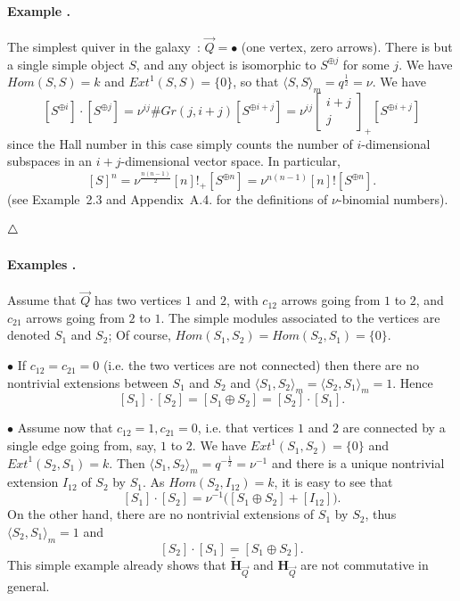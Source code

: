 \documentclass[a4paper,10pt]{amsart}
\def\H{\mathbf{H}}
\def\endexample{$\hfill \triangle$}
\def\v{\nu}
\numberwithin{equation}{section}
\begin{document}
\paragraph{\textbf{Example \thetheo.}} The simplest quiver in the galaxy~: $\vec{Q}=\bullet$ (one vertex, zero arrows). There is but a single simple object $S$, and any object is isomorphic to $S^{\oplus j}$ for some $j$. We have ${Hom}(S,S)=k$ and ${Ext}^1(S,S)=\{0\}$, so that $\langle S,S \rangle_m=q^{\frac{1}{2}}=\v$. We have
$$[S^{\oplus i}] \cdot [S^{\oplus j}]=\v^{ij} \# Gr(j,i+j) [S^{\oplus i+j}]=\v^{ij} \begin{bmatrix} i+j \\ j \end{bmatrix}_+ [S^{\oplus i+j}]$$
since the Hall number in this case simply counts the number of $i$-dimensional subspaces in an $i+j$-dimensional vector space.  In particular,
\begin{equation}\label{E:powerE}
[S]^n=\v^{\frac{n(n-1)}{2}} [n]!_+ [S^{\oplus n}]=\v^{n(n-1)}[n]! [S^{\oplus n}].
\end{equation}
(see Example~2.3 and Appendix~A.4. for the definitions of $\v$-binomial numbers).

\endexample

\vspace{.15in}

\addtocounter{theo}{1}
\paragraph{\textbf{Examples \thetheo.}} Assume that $\vec{Q}$ has two vertices $1$ and $2$, with $c_{12}$ arrows going from $1$ to $2$, and $c_{21}$ arrows going from $2$ to $1$. The simple modules associated to the vertices are denoted $S_1$ and $S_2$; Of course, ${Hom}(S_1,S_2)={Hom}(S_2,S_1)=\{0\}$.

\vspace{.05in}

\noindent
$\bullet$ If $c_{12}=c_{21}=0$ (i.e. the two vertices are not connected) then
there are no nontrivial extensions between $S_1$ and $S_2$ and $\langle S_1,S_2 \rangle_m=\langle S_2,S_1 \rangle_m=1$. Hence
$$[S_1] \cdot [S_2]=[S_1 \oplus S_2]=[S_2] \cdot [S_1].$$

\vspace{.05in}

\noindent
$\bullet$ Assume now that $c_{12}=1, c_{21}=0$, i.e. that vertices $1$ and $2$ are connected by a single edge going from, say, $1$ to $2$. We have ${Ext}^1(S_1,S_2)=\{0\}$ and ${Ext}^1(S_2,S_1)=k$. Then
$\langle S_1,S_2 \rangle_m=q^{-\frac{1}{2}}=\v^{-1}$ and there is a unique nontrivial extension $I_{12}$ of $S_2$ by $S_1$. As ${Hom}(S_2,I_{12})=k$, it is easy to see that
$$[S_1] \cdot [S_2]=\v^{-1} \big( [S_1 \oplus S_2] + [I_{12}]\big).$$
On the other hand, there are no nontrivial extensions of $S_1$ by $S_2$, thus $\langle S_2,S_1\rangle_m=1$ and
$$[S_2] \cdot [S_1] = [S_1 \oplus S_2].$$
This simple example already shows that $\widetilde{\mathbf{H}}_{\vec{Q}}$ and $\H_{\vec{Q}}$ are not commutative in general.
\end{document}
